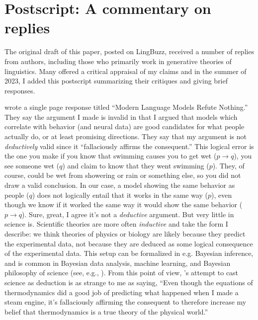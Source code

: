 \documentclass[output=paper,colorlinks,citecolor=brown
]{langscibook}
\begin{document}
\newpage 


\section*{Postscript: A commentary on replies}

The original draft of this paper, posted on LingBuzz, received a number of replies from authors, including those who primarily work in generative theories of linguistics. Many offered a critical appraisal of my claims and in the summer of 2023, I added this postscript  summarizing their critiques and giving brief responses.

\cite{rawski2023modern} wrote a single page response titled ``Modern Language Models Refute Nothing.'' They say the argument I made is invalid in that I argued that models which correlate with behavior (and neural data) are good candidates for what people actually do, or at least promising directions. They say that my argument is not \emph{deductively} valid since it ``fallaciously affirms the consequent.'' This logical error is the one you make if you know that swimming causes you to get wet ($p \to q$), you see someone wet ($q$) and claim to know that they went swimming ($p$). They, of course, could be wet from showering or rain or something else, so you did not draw a valid conclusion. In our case, a model showing the same behavior as people ($q$) does not logically entail that it works in the same way ($p$), even though we know if it worked the same way it would show the same behavior ($p \to q$). Sure, great, I agree it's not a \emph{deductive} argument. But very little in science is. Scientific theories are more often \emph{inductive} and take the form I describe: we think theories of physics or biology are likely because they predict the experimental data, not because they are deduced as some logical consequence of the experimental data. This setup can be formalized in e.g. Bayesian inference, and is common in Bayesian data analysis, machine learning, and Bayesian philosophy of science (see, e.g., \cite{jeffreys1998theory,godfrey2009theory}). From this point of view, \cite{rawski2023modern}'s attempt to cast science as deduction is as strange to me as saying, ``Even though the equations of thermodynamics did a good job of predicting what happened when I made a steam engine, it's fallaciously affirming the consequent to therefore increase my belief that thermodynamics is a true theory of the physical world.'' 
\end{document}
